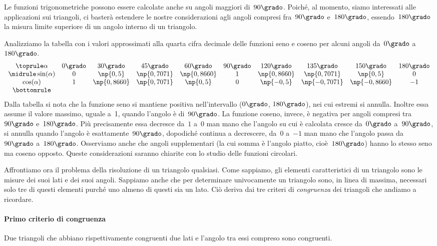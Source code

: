 Le funzioni trigonometriche possono essere calcolate anche su angoli maggiori di~$90\grado$. Poiché, al momento, siamo interessati alle
applicazioni sui triangoli, ci basterà estendere le nostre considerazioni agli angoli compresi fra~$90\grado$ e~$180\grado$,
essendo~$180\grado$ la misura limite superiore di un angolo interno di un triangolo.
\begin{exrig}
 \begin{esempio}
Analizziamo la tabella con i valori approssimati alla quarta cifra decimale delle funzioni seno e coseno per alcuni angoli da~$0\grado$ a~$180\grado$.
\[
\begin{array}{cccccccccccc}
\toprule
\alpha&0\grado &30\grado &45\grado &60\grado &90\grado & 120\grado & 135\grado &150\grado &180\grado\\
\midrule
\sin(\alpha)& 0 & \np{0,5} & \np{0,7071} & \np{0,8660} & 1 & \np{0,8660} & \np{0,7071} & \np{0,5} & 0\\
\cos(\alpha)& 1 & \np{0,8660} & \np{0,7071} & \np{0,5} & 0 & \np{-0,5} & \np{-0,7071} & \np{-0,8660} &-1\\
\bottomrule
\end{array}
\]
Dalla tabella si nota che la funzione seno si mantiene positiva nell'intervallo ($0\grado$, $180\grado$), nei cui estremi si annulla.
Inoltre essa assume il valore massimo, uguale a~1, quando l'angolo è di~$90\grado$.
La funzione coseno, invece, è negativa per angoli compresi tra~$90\grado$ e~$180\grado$. Più precisamente essa decresce da~$1$ a~$0$
man mano che l'angolo su cui è calcolata cresce da~$0\grado$ a~$90\grado$, si annulla quando l'angolo è esattamente~$90\grado$, dopodiché continua a decrescere, da~$0$ a~$-1$ man mano che l'angolo passa da~$90\grado$ a~$180\grado$.
Osserviamo anche che angoli supplementari (la cui somma è l'angolo piatto, cioè~$180\grado$) hanno lo stesso seno ma coseno opposto.
Queste considerazioni saranno chiarite con lo studio delle funzioni circolari.
 \end{esempio}
\end{exrig}
Affrontiamo ora il problema della risoluzione di un triangolo qualsiasi.
Come sappiamo, gli elementi caratteristici di un triangolo sono le misure dei suoi lati e dei suoi angoli.
Sappiamo anche che per determinare univocamente un triangolo sono, in linea di massima, necessari solo tre di questi elementi
purché uno almeno di questi sia un lato. Ciò deriva dai tre criteri di \emph{congruenza} dei triangoli che andiamo a ricordare.

\paragraph{Primo criterio di congruenza} Due triangoli che abbiano rispettivamente congruenti due lati e l'angolo tra essi
compreso sono congruenti.

